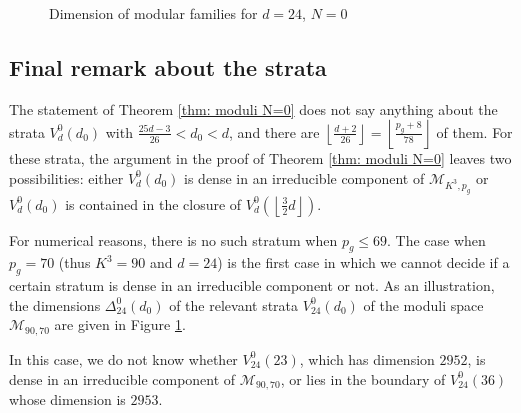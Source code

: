 \documentclass[a4paper,11pt]{amsart}
\newcommand{\M}{\ensuremath{\mathcal{M}}}
\newcommand{\s}{\ensuremath{\mathfrak{s}}}
\theoremstyle{definition}
\theoremstyle{remark}
\numberwithin{equation}{section}
\begin{document}
\begin{figure}[ht]
\begin{tikzpicture}[scale=0.7,xscale=0.4,yscale=0.1,domain=36:390]
  \end{tikzpicture}
\caption{Dimension of modular families for $d=24$, $N=0$}\label{figure!dimension-graph}
\end{figure}


\subsection{Final remark about the strata} \label{subsection: final}
The statement of Theorem \ref{thm: moduli N=0} does not say anything about the strata $V^0_d(d_0)$ with $\frac{25d-3}{26} < d_0 < d$, and there are $\left\lfloor \frac{d + 2}{26} \right\rfloor = \left\lfloor \frac{p_g+8}{78} \right\rfloor$ of them. For these strata, the argument in the proof of Theorem \ref{thm: moduli N=0} leaves two possibilities: either $V^0_d(d_0)$ is dense in an irreducible component of $\M_{K^3, p_g}$ or $V^0_d(d_0)$ is contained in the closure of $V^0_d\left( \left\lfloor \frac32 d \right\rfloor\right)$.

For numerical reasons, there is no such stratum when $p_g \le 69$. The case when $p_g = 70$ (thus $K^3 = 90$ and $d = 24$) is the first case in which we cannot decide if a certain stratum is dense in an irreducible component or not. As an illustration, the dimensions $\Delta^0_{24}(d_0)$ of the relevant strata $V^0_{24}(d_0)$ of the moduli space $\M_{90, 70}$ are given in Figure \ref{figure!dimension-graph}.


In this case, we do not know whether $V^0_{24}(23)$, which has dimension $2952$, is dense in an irreducible component of $\M_{90, 70}$, or lies in the boundary of $V^0_{24}(36)$ whose dimension is $2953$.
\end{document}
